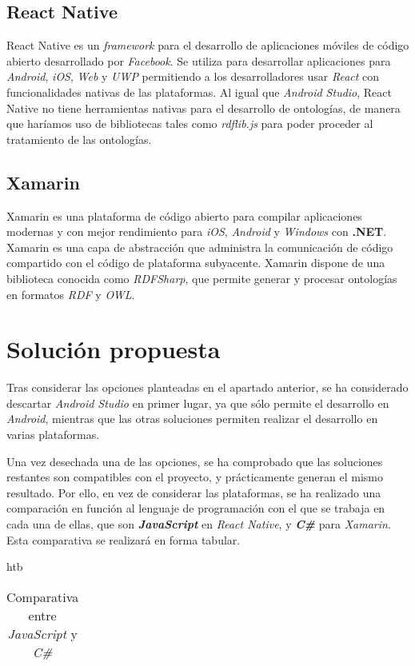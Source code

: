 \subsection{React Native}
React Native es un \textit{framework} para el desarrollo de aplicaciones móviles de código abierto desarrollado por 
\textit{Facebook}. Se utiliza para desarrollar aplicaciones para \textit{Android}, \textit{iOS}, \textit{Web} y 
\textit{UWP} permitiendo a los desarrolladores usar \textit{React} con funcionalidades nativas de las plataformas.
Al igual que \textit{Android Studio}, React Native no tiene herramientas nativas para el desarrollo de ontologías, de 
manera que haríamos uso de bibliotecas tales como \textit{rdflib.js} para poder proceder al tratamiento de las ontologías.

\subsection{Xamarin}
Xamarin es una plataforma de código abierto para compilar aplicaciones modernas y con mejor rendimiento para \textit{iOS}, 
\textit{Android} y \textit{Windows} con \textbf{.NET}. Xamarin es una capa de abstracción que administra la comunicación 
de código compartido con el código de plataforma subyacente. Xamarin dispone de una biblioteca conocida como 
\textit{RDFSharp}, que permite generar y procesar ontologías en formatos \textit{RDF} y \textit{OWL}.


\section{Solución propuesta}
Tras considerar las opciones planteadas en el apartado anterior, se ha considerado descartar \textit{Android Studio} en 
primer lugar, ya que sólo permite el desarrollo en \textit{Android}, mientras que las otras soluciones permiten realizar 
el desarrollo en varias plataformas. \medskip

Una vez desechada una de las opciones, se ha comprobado que las soluciones restantes son compatibles con el proyecto, y 
prácticamente generan el mismo resultado. Por ello, en vez de considerar las plataformas, se ha realizado una comparación 
en función al lenguaje de programación con el que se trabaja en cada una de ellas, que son \textit{\textbf{JavaScript}} en 
\textit{React Native}, y \textit{\textbf{C\#}} para \textit{Xamarin}. Esta comparativa se realizará en forma tabular.\bigskip

\begin{table}{htb}
\centering
\caption{Comparativa entre \textit{JavaScript} y \textit{C\#}}
\begin{tabular}{|c|c|}
    \hline
    
    
\end{tabular}
\end{table}  






